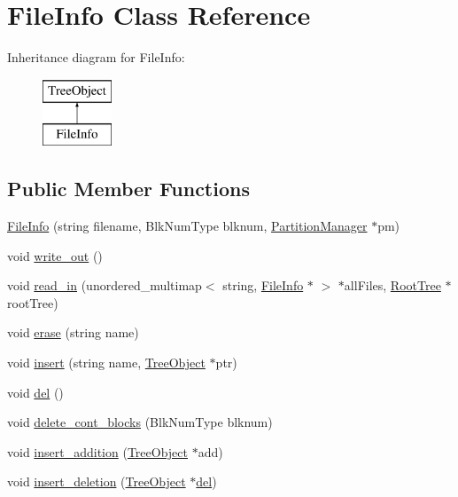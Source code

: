 \hypertarget{classFileInfo}{}\section{File\+Info Class Reference}
\label{classFileInfo}
Inheritance diagram for File\+Info\+:\begin{figure}[H]
\begin{center}
\leavevmode
\includegraphics[height=2.000000cm]{classFileInfo}
\end{center}
\end{figure}
\subsection*{Public Member Functions}
\begin{DoxyCompactItemize}
\item 
\hyperlink{classFileInfo_a3586bb4f50c4a0f63ff4ea0a1e56ce9c}{File\+Info} (string filename, Blk\+Num\+Type blknum, \hyperlink{classPartitionManager}{Partition\+Manager} $\ast$pm)
\item 
void \hyperlink{classFileInfo_a8e835f000ddfd0f1097ccfa7e7801a09}{write\+\_\+out} ()
\item 
void \hyperlink{classFileInfo_ad03ba3ec10f8e9ad75d659ae36dcd155}{read\+\_\+in} (unordered\+\_\+multimap$<$ string, \hyperlink{classFileInfo}{File\+Info} $\ast$ $>$ $\ast$all\+Files, \hyperlink{classRootTree}{Root\+Tree} $\ast$root\+Tree)
\item 
void \hyperlink{classFileInfo_ae058242283d3317eaf2b79428e6137f6}{erase} (string name)
\item 
void \hyperlink{classFileInfo_ad93a84b63e417b07aa68b619051ab746}{insert} (string name, \hyperlink{classTreeObject}{Tree\+Object} $\ast$ptr)
\item 
void \hyperlink{classFileInfo_a2ca34d945ed1208f227a249ba72ee427}{del} ()
\item 
void \hyperlink{classFileInfo_a8c6b58cb9f7e9978064291ef81380e01}{delete\+\_\+cont\+\_\+blocks} (Blk\+Num\+Type blknum)
\item 
void \hyperlink{classFileInfo_a7f788f31521c535646eebfa9959bbb24}{insert\+\_\+addition} (\hyperlink{classTreeObject}{Tree\+Object} $\ast$add)
\item 
void \hyperlink{classFileInfo_a278136b1d68f55dc56a4be807076fc0d}{insert\+\_\+deletion} (\hyperlink{classTreeObject}{Tree\+Object} $\ast$\hyperlink{classFileInfo_a2ca34d945ed1208f227a249ba72ee427}{del})
\end{DoxyCompactItemize}
